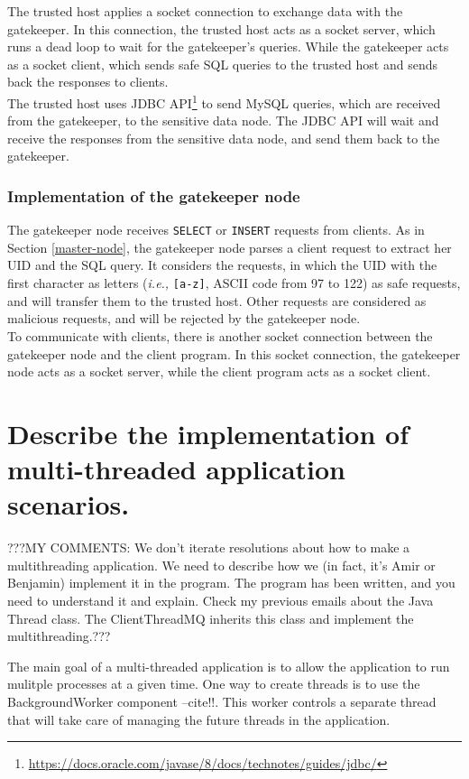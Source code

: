 \documentclass{article}
\begin{document}
The trusted host applies a socket connection to exchange data with the gatekeeper. In this connection, the trusted host acts as a socket server, which runs a dead loop to wait for the gatekeeper's queries. While the gatekeeper acts as a socket client, which sends safe SQL queries to the trusted host and sends back the responses to clients.\\

The trusted host uses JDBC API\footnote{\url{https://docs.oracle.com/javase/8/docs/technotes/guides/jdbc/}} to send MySQL queries, which are received from the gatekeeper, to the sensitive data node. The JDBC API will wait and receive the responses from the sensitive data node, and send them back to the gatekeeper.

\subsubsection{Implementation of the gatekeeper node}
The gatekeeper node receives \texttt{SELECT} or \texttt{INSERT} requests from clients. As in Section \ref{master-node}, the gatekeeper node parses a client request to extract her UID and the SQL query. It considers the requests, in which the UID with the first character as letters (\emph{i.e.,} \texttt{[a-z]}, ASCII code from 97 to 122) as safe requests, and will transfer them to the trusted host. Other requests are considered as malicious requests, and will be rejected by the gatekeeper node. \\

To communicate with clients, there is another socket connection between the gatekeeper node and the client program. In this socket connection, the gatekeeper node acts as a socket server, while the client program acts as a socket client.


\section{Describe the implementation of multi-threaded application scenarios.}\label{Q4}

???MY COMMENTS: We don't iterate resolutions about how to make a multithreading application. We need to describe how we (in fact, it's Amir or Benjamin) implement it in the program. The program has been written, and you need to understand it and explain. Check my previous emails about the Java Thread class. The ClientThreadMQ inherits this class and implement the multithreading.???

The main goal of a multi-threaded application is to allow the application to run mulitple processes at a given time. One way to create threads is to use the BackgroundWorker component --cite!!. This worker controls a separate thread that will take care of managing the future threads in the application. 
\end{document}
